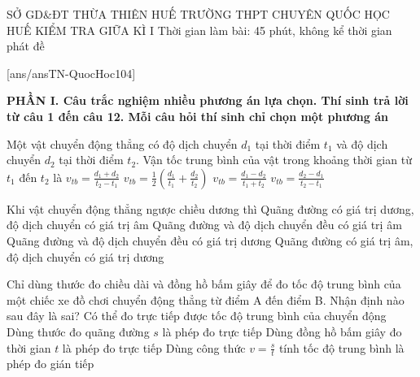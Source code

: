 \def\toanlop{10}
\def\thoigian{45}
\def\namhoc{2024 - 2025}
\begin{dethi}
	{SỞ GD\&ĐT THỪA THIÊN HUẾ}
	{TRƯỜNG THPT CHUYÊN QUỐC HỌC HUẾ}
	{KIỂM TRA GIỮA KÌ I}
	{Thời gian làm bài: 45 phút, không kể thời gian phát đề}
\end{dethi}

[ans/ansTN-QuocHoc104]

\noindent \textbf{PHẦN I. Câu trắc nghiệm nhiều phương án lựa chọn. Thí sinh trả lời từ câu 1 đến câu 12. Mỗi câu hỏi thí sinh chỉ chọn một phương án}
\vspace{0.2cm}

\begin{ex}%
	Một vật chuyển động thẳng có độ dịch chuyển $d_1$ tại thời điểm $t_1$ và độ dịch chuyển $d_2$ tại thời điểm $t_2$. Vận tốc trung bình của vật trong khoảng thời gian từ $t_1$ đến $t_2$ là
	\choice
	{$v_{tb}=\frac{d_1+d_2}{t_2-t_1}$}
	{$v_{tb}=\frac{1}{2}\left(\frac{d_1}{t_1}+\frac{d_2}{t_2}\right)$}
	{$v_{tb}=\frac{d_1-d_2}{t_1+t_2}$}
	{\True $v_{tb}=\frac{d_2-d_1}{t_2-t_1}$}
\end{ex}

\begin{ex}%
	Khi vật chuyển động thẳng ngược chiều dương thì
	\choice
	{\True Quãng đường có giá trị dương, độ dịch chuyển có giá trị âm}
	{Quãng đường và độ dịch chuyển đều có giá trị âm}
	{Quãng đường và độ dịch chuyển đều có giá trị dương}
	{Quãng đường có giá trị âm, độ dịch chuyển có giá trị dương}
\end{ex}

\begin{ex}%
	Chỉ dùng thước đo chiều dài và đồng hồ bấm giây để đo tốc độ trung bình của một chiếc xe đồ chơi chuyển động thẳng từ điểm A đến điểm B. Nhận định nào sau đây là sai?
	\choice
	{\True Có thể đo trực tiếp được tốc độ trung bình của chuyển động}
	{Dùng thước đo quãng đường $s$ là phép đo trực tiếp}
	{Dùng đồng hồ bấm giây đo thời gian $t$ là phép đo trực tiếp}
	{Dùng công thức $v=\frac{s}{t}$ tính tốc độ trung bình là phép đo gián tiếp}
\end{ex}

